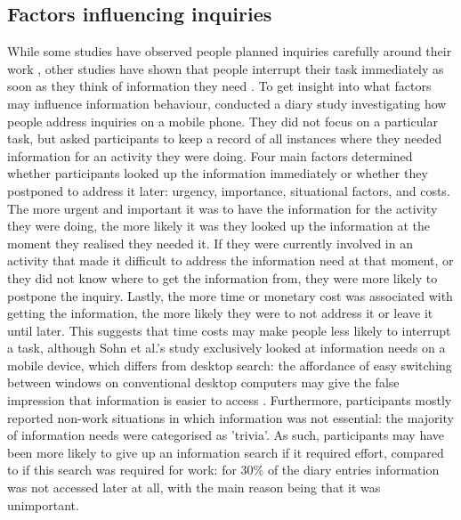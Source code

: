 \subsection{Factors influencing inquiries}
While some studies have observed people planned inquiries carefully around their work \citep{Reddy2002}, other studies have shown that people interrupt their task immediately as soon as they think of information they need \citep{Jin2009}.
To get insight into what factors may influence information behaviour, \citet{Sohn2008} conducted a diary study investigating how people address inquiries on a mobile phone. They did not focus on a particular task, but asked participants to keep a record of all instances where they needed information for an activity they were doing.  Four main factors determined whether participants looked up the information immediately or whether they postponed to address it later: urgency, importance, situational factors, and costs. The more urgent and important it was to have the information for the activity they were doing, the more likely it was they looked up the information at the moment they realised they needed it. If they were currently involved in an activity that made it difficult to address the information need at that moment, or they did not know where to get the information from, they were more likely to postpone the inquiry. Lastly, the more time or monetary cost was associated with getting the information, the more likely they were to not address it or leave it until later. This suggests that time costs may make people less likely to interrupt a task, although Sohn et al.’s study exclusively looked at information needs on a mobile device, which differs from desktop search: the affordance of easy switching between windows on conventional desktop computers may give the false impression that information is easier to access \citep{Sellen2003}. Furthermore, participants mostly reported non-work situations in which information was not essential: the majority of information needs were categorised as 'trivia'. As such, participants may have been more likely to give up an information search if it required effort, compared to if this search was required for work: for 30\% of the diary entries information was not accessed later at all, with the main reason being that it was unimportant. 

